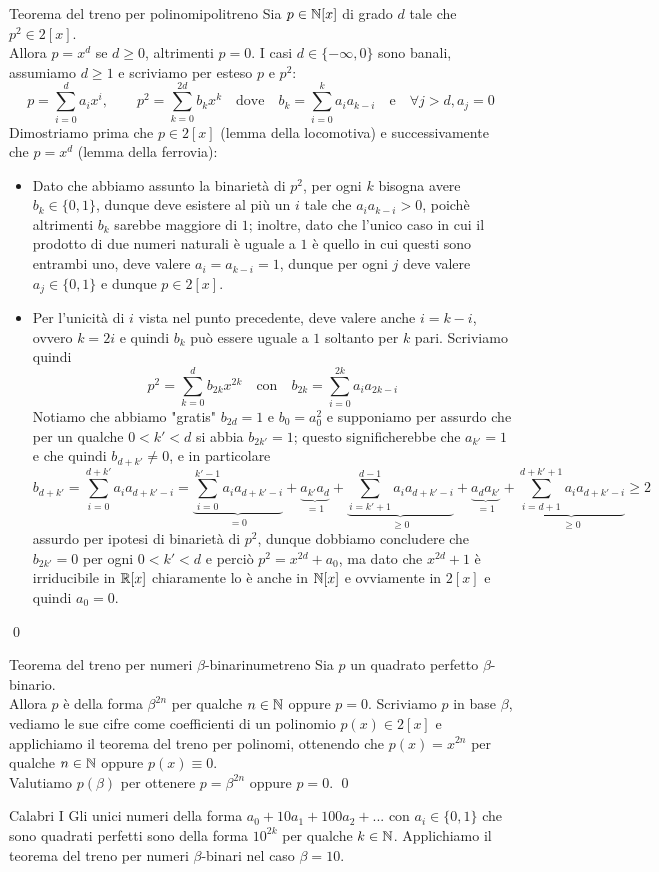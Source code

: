 \documentclass{article}
\begin{document}
\begin{theorem}{Teorema del treno per polinomi}{politreno}
    Sia $p \in \mathbb{N}[x]$ di grado $d$ tale che $p^2 \in 2[x]$.\\
    Allora $p = x^d$ se $d\ge 0$, altrimenti $p=0$.
    \proof 
    I casi $d\in\{-\infty, 0\}$ sono banali, assumiamo $d\ge 1$ e scriviamo per esteso $p$ e $p^2$:
    \[p = \sum_{i=0}^d a_i x^i, \qquad p^2 = \sum_{k=0}^{2d} b_k x^k \quad\text{dove}\quad b_k = \sum_{i=0}^k a_i a_{k-i} \quad\text{e}\quad \forall j > d, a_j=0\]
    Dimostriamo prima che $p \in 2[x]$ (lemma della locomotiva) e successivamente che $p = x^d$ (lemma della ferrovia):\begin{itemize}
        \item Dato che abbiamo assunto la binarietà di $p^2$, per ogni $k$ bisogna avere $b_k \in\{0,1\}$, dunque deve esistere al più un $i$ tale che $a_i a_{k-i} > 0$, poichè altrimenti $b_k$ sarebbe maggiore di $1$; inoltre, dato che l'unico caso in cui il prodotto di due numeri naturali è uguale a $1$ è quello in cui questi sono entrambi uno, deve valere $a_i = a_{k-i} = 1$, dunque per ogni $j$ deve valere $a_j \in \{0,1\}$ e dunque $p \in 2[x]$.
        \item Per l'unicità di $i$ vista nel punto precedente, deve valere anche $i = k-i$, ovvero $k = 2i$ e quindi $b_k$ può essere uguale a $1$ soltanto per $k$ pari. Scriviamo quindi
        \[ p^2 = \sum_{k=0}^d b_{2k} x^{2k} \quad \text{con}\quad b_{2k} = \sum_{i=0}^{2k}a_{i}a_{2k-i} \]
        Notiamo che abbiamo "gratis" $b_{2d} = 1$ e $b_0 = a_0^2$ e supponiamo per assurdo che per un qualche $0<k'<d$ si abbia $b_{2k'}=1$; questo significherebbe che $a_{k'}=1$ e che quindi $b_{d+k'}\neq 0$, e in particolare
        \[ b_{d+k'} = \sum_{i=0}^{d+k'} a_i a_{d+k'-i} = \underbrace{\sum_{i=0}^{k'-1} a_ia_{d+k'-i}}_{=0} + \underbrace{a_{k'}a_{d}}_{=1} + \underbrace{\sum_{i = k'+1}^{d-1} a_{i} a_{d+k'-i} }_{\ge 0} + \underbrace{a_{d}a_{k'}}_{=1} + \underbrace{\sum_{i=d+1}^{d+k'+1}a_i a_{d+k'-i}}_{\ge 0}\ge 2\]
        assurdo per ipotesi di binarietà di $p^2$, dunque dobbiamo concludere che $b_{2k'} = 0$ per ogni $0<k'<d$ e perciò $p^2 = x^{2d} + a_0$, ma dato che $x^{2d} +1$ è irriducibile in $\mathbb{R}[x]$ chiaramente lo è anche in $\mathbb{N}[x]$ e ovviamente in $2[x]$ e quindi $a_0 = 0$.
    \end{itemize}
    \qed
\end{theorem}

\begin{corollary}{Teorema del treno per numeri $\beta$-binari}{numetreno}
    Sia $p$ un quadrato perfetto $\beta$-binario.\\ 
    Allora $p$ è della forma $\beta^{2n}$ per qualche $n\in \mathbb{N}$ oppure $p=0$.
    \proof 
    Scriviamo $p$ in base $\beta$, vediamo le sue cifre come coefficienti di un polinomio $p(x) \in 2[x]$ e applichiamo il teorema del treno per polinomi, ottenendo che $p(x) = x^{2n}$ per qualche $n \in \mathbb{N}$ oppure $p(x)\equiv 0$.\\
    Valutiamo $p(\beta)$ per ottenere $p = \beta^{2n}$ oppure $p = 0$.
    \qed
\end{corollary}

\begin{corollary}{Calabri I}{}
    Gli unici numeri della forma $a_0+10a_1+100a_2+...$ con $a_i \in \{0,1\}$ che sono quadrati perfetti sono della forma $10^{2k}$ per qualche $k \in \mathbb{N}$.
    \proof 
    Applichiamo il teorema del treno per numeri $\beta$-binari nel caso $\beta=10$.
\end{corollary}
\end{document}
